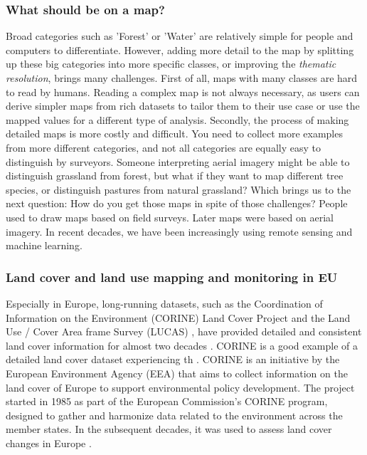     \subsubsection{What should be on a map?}

        Broad categories such as 'Forest' or 'Water' are relatively simple for people and computers to differentiate. However, adding more detail to the map by splitting up these big categories into more specific classes, or improving the \textit{thematic resolution}, brings many challenges. First of all, maps with many classes are hard to read by humans. Reading a complex map is not always necessary, as users can derive simpler maps from rich datasets to tailor them to their use case \citep{tsendbazar2017integrating} or use the mapped values for a different type of analysis. 
        Secondly, the process of making detailed maps is more costly and difficult. You need to collect more examples from more different categories, and not all categories are equally easy to distinguish by surveyors. Someone interpreting aerial imagery might be able to distinguish grassland from forest, but what if they want to map different tree species, or distinguish pastures from natural grassland?
        Which brings us to the next question: How do you get those maps in spite of those challenges? People used to draw maps based on field surveys. Later maps were based on aerial imagery. In recent decades, we have been increasingly using remote sensing and machine learning.

    \subsubsection{Land cover and land use mapping and monitoring in EU}

        Especially in Europe, long-running datasets, such as the Coordination of Information on the Environment (CORINE) Land Cover Project and the Land Use / Cover Area frame Survey (LUCAS) \citep{dandrimont2021lucas}, have provided detailed and consistent land cover information for almost two decades \citep{gallego2008using}. 
        CORINE is a good example of a detailed land cover dataset experiencing th . CORINE is an initiative by the European Environment Agency (EEA) that aims to collect information on the land cover of Europe to support environmental policy development. The project started in 1985 as part of the European Commission's CORINE program, designed to gather and harmonize data related to the environment across the member states. In the subsequent decades, it was used to assess land cover changes in Europe \citep{mucher2000land, feranec2010determining}. 

